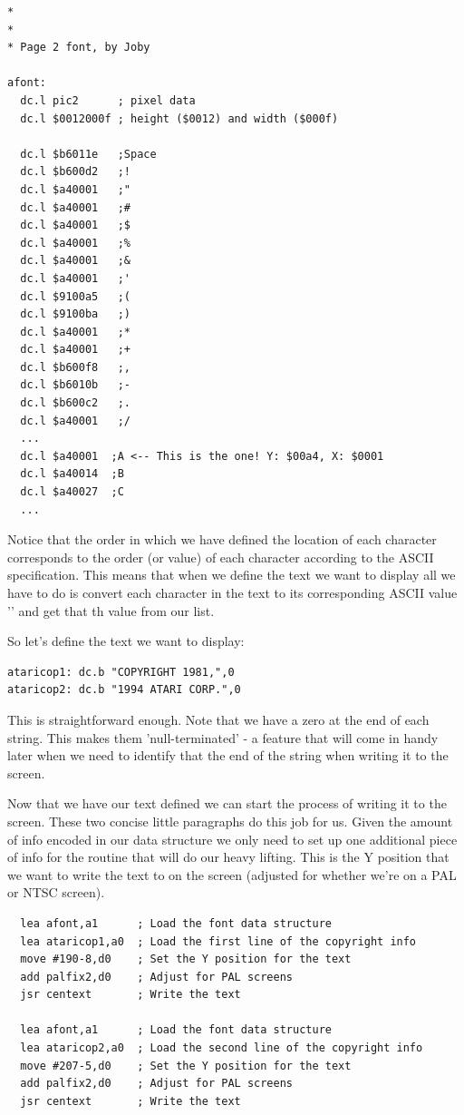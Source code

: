 \begin{lstlisting}[caption=The opening block of the \icode{afont} data structure in source file \icode{afont.s}.]
*
*
* Page 2 font, by Joby

afont:  
  dc.l pic2      ; pixel data
  dc.l $0012000f ; height ($0012) and width ($000f)

  dc.l $b6011e   ;Space
  dc.l $b600d2   ;!
  dc.l $a40001   ;"
  dc.l $a40001   ;#
  dc.l $a40001   ;$
  dc.l $a40001   ;%
  dc.l $a40001   ;&
  dc.l $a40001   ;'
  dc.l $9100a5   ;(
  dc.l $9100ba   ;)
  dc.l $a40001   ;*
  dc.l $a40001   ;+
  dc.l $b600f8   ;,
  dc.l $b6010b   ;-
  dc.l $b600c2   ;.
  dc.l $a40001   ;/
  ...
  dc.l $a40001  ;A <-- This is the one! Y: $00a4, X: $0001
  dc.l $a40014  ;B
  dc.l $a40027  ;C
  ...
\end{lstlisting}

Notice that the order in which we have defined the location of each character corresponds to the order (or value) of each character
according to the ASCII specification. This means that when we define the text we want to display all we have to do is convert each
character in the text to its corresponding ASCII value '' and get that th value from our  list.

So let's define the text we want to display:

\begin{lstlisting}
ataricop1: dc.b "COPYRIGHT 1981,",0
ataricop2: dc.b "1994 ATARI CORP.",0
\end{lstlisting}

This is straightforward enough. Note that we have a zero at the end of each string. This makes them 'null-terminated' - a feature
that will come in handy later when we need to identify that the end of the string when writing it to the screen.

Now that we have our text defined we can start the process of writing it to the screen. These two concise little paragraphs
do this job for us. Given the amount of info encoded in our  data structure we only need to set up one additional
piece of info for the  routine that will do our heavy lifting. This is the Y position that we want to write
the text to on the screen (adjusted for whether we're on a PAL or NTSC screen).

\begin{lstlisting}
  lea afont,a1      ; Load the font data structure
  lea ataricop1,a0  ; Load the first line of the copyright info
  move #190-8,d0    ; Set the Y position for the text
  add palfix2,d0    ; Adjust for PAL screens 
  jsr centext       ; Write the text                 

  lea afont,a1      ; Load the font data structure
  lea ataricop2,a0  ; Load the second line of the copyright info
  move #207-5,d0    ; Set the Y position for the text
  add palfix2,d0    ; Adjust for PAL screens 
  jsr centext       ; Write the text                 
\end{lstlisting}

